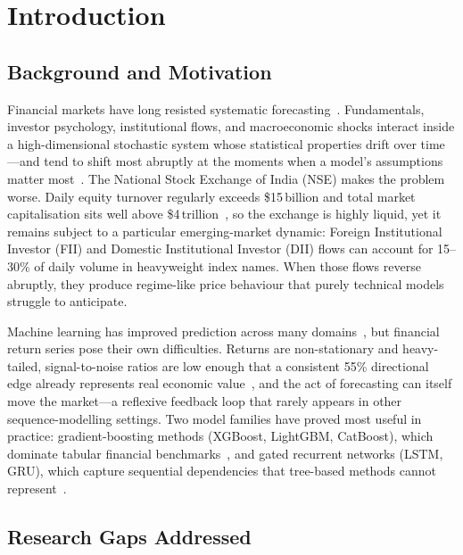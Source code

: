 \documentclass[10pt,a4paper,twoside]{article}
\begin{document}
\section{Introduction}

\subsection{Background and Motivation}

Financial markets have long resisted systematic
forecasting~\cite{fama1970}. Fundamentals, investor psychology, institutional
flows, and macroeconomic shocks interact inside a high-dimensional stochastic
system whose statistical properties drift over time---and tend to shift most
abruptly at the moments when a model's assumptions matter
most~\cite{mandelbrot1997}. The National Stock
Exchange of India (NSE) makes the problem worse. Daily equity turnover
regularly exceeds \$15\,billion and total market capitalisation sits well above
\$4\,trillion~\cite{nse2024}, so the exchange is highly liquid, yet it remains
subject to a particular emerging-market dynamic: Foreign Institutional Investor
(FII) and Domestic Institutional Investor (DII) flows can account for
15--30\% of daily volume in heavyweight index names. When those flows reverse
abruptly, they produce regime-like price behaviour that purely technical models
struggle to anticipate.

Machine learning has improved prediction across many
domains~\cite{lecun2015}, but financial return series pose their own
difficulties. Returns are non-stationary and heavy-tailed, signal-to-noise
ratios are low enough that a consistent 55\% directional edge already
represents real economic value~\cite{lopez2018}, and the act of forecasting
can itself move the market---a reflexive feedback loop that rarely appears in
other sequence-modelling settings.
Two model families have proved most useful in practice:
gradient-boosting methods (XGBoost, LightGBM, CatBoost), which dominate
tabular financial benchmarks~\cite{grinsztajn2022}, and gated recurrent
networks (LSTM, GRU), which capture sequential dependencies that tree-based
methods cannot represent~\cite{hochreiter1997,cho2014}.

\subsection{Research Gaps Addressed}
\end{document}
